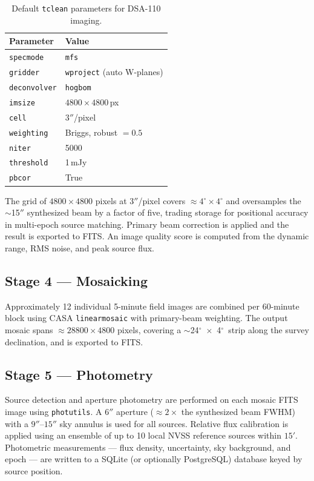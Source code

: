 \documentclass[12pt,a4paper]{article}
\newcommand{\degr}{\ensuremath{^\circ}}
\newcommand{\code}[1]{\colorbox{codegray}{\texttt{\small #1}}}
\begin{document}
\begin{table}[h!]
  \centering
  \caption{Default \texttt{tclean} parameters for DSA-110 imaging.}
  \label{tab:tclean}
  \begin{tabular}{ll}
    \toprule
    \textbf{Parameter} & \textbf{Value} \\
    \midrule
    \code{specmode}    & \code{mfs} \\
    \code{gridder}     & \code{wproject} (auto W-planes) \\
    \code{deconvolver} & \code{hogbom} \\
    \code{imsize}      & $4800 \times 4800$\,px \\
    \code{cell}        & $3''$/pixel \\
    \code{weighting}   & Briggs, robust $= 0.5$ \\
    \code{niter}       & 5000 \\
    \code{threshold}   & 1\,mJy \\
    \code{pbcor}       & True \\
    \bottomrule
  \end{tabular}
\end{table}

The grid of $4800 \times 4800$ pixels at $3''$/pixel covers $\approx4\degr
\times 4\degr$ and oversamples the $\sim$15$''$ synthesized beam by a factor
of five, trading storage for positional accuracy in multi-epoch source
matching.  Primary beam correction is applied and the result is exported to
FITS.  An image quality score is computed from the dynamic range, RMS noise,
and peak source flux.

\subsection{Stage 4 --- Mosaicking}

Approximately 12 individual 5-minute field images are combined per 60-minute
block using CASA \code{linearmosaic} with primary-beam weighting.  The output
mosaic spans $\approx 28800 \times 4800$ pixels, covering a $\sim$24\degr\
$\times$~4\degr\ strip along the survey declination, and is exported to FITS.

\subsection{Stage 5 --- Photometry}

Source detection and aperture photometry are performed on each mosaic FITS
image using \texttt{photutils}.  A $6''$ aperture ($\approx 2\times$ the
synthesized beam FWHM) with a $9''$--$15''$ sky annulus is used for all
sources.  Relative flux calibration is applied using an ensemble of up to 10
local NVSS reference sources within $15'$.  Photometric measurements --- flux
density, uncertainty, sky background, and epoch --- are written to a SQLite
(or optionally PostgreSQL) database keyed by source position.
\end{document}
